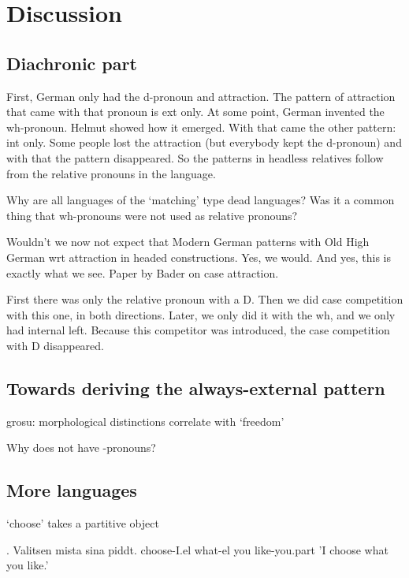 
\chapter{Discussion}\label{ch:discussion}


\section{Diachronic part}

First, German only had the d-pronoun and attraction. The pattern of attraction that came with that pronoun is ext only.
At some point, German invented the wh-pronoun. Helmut showed how it emerged. With that came the other pattern: int only. Some people lost the attraction (but everybody kept the d-pronoun) and with that the pattern disappeared.
So the patterns in headless relatives follow from the relative pronouns in the language.

Why are all languages of the `matching' type dead languages?
Was it a common thing that wh-pronouns were not used as relative pronouns?

Wouldn't we now not expect that Modern German patterns with Old High German wrt attraction in headed constructions. Yes, we would. And yes, this is exactly what we see. Paper by Bader on case attraction.

First there was only the relative pronoun with a D. Then we did case competition with this one, in both directions. Later, we only did it with the wh, and we only had internal left. Because this competitor was introduced, the case competition with D disappeared.


\section{Towards deriving the always-external pattern}

grosu: morphological distinctions correlate with `freedom'

Why  does not have -pronouns?


\section{More languages}

 `choose' takes a partitive object

\ex. Valitsen mista sina piddt.
choose-I.el what-el you like-you.part
'I choose what you like.'

